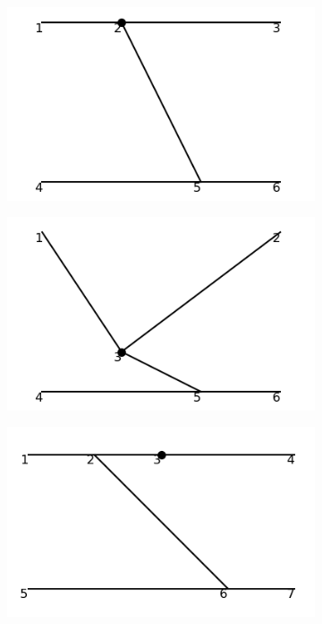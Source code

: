 \documentclass[11pt,a4paper,twoside,pdf]{article}
\numberwithin{equation}{section}
\begin{document}
\begin{figure}[h!]
\begin{subfigure}[t]{0.16\textwidth}
    \end{subfigure}
    \hfill
    \begin{subfigure}[t]{0.16\textwidth}
        \centering
        \includegraphics[width=\textwidth]{plots/order4_2to2/counterterms/4.png}
    \end{subfigure}
    \hfill
    \begin{subfigure}[t]{0.16\textwidth}
        \centering
        \includegraphics[width=\textwidth]{plots/order4_2to2/counterterms/5.png}
    \end{subfigure}
    \hfill
    \begin{subfigure}[t]{0.16\textwidth}
        \centering
        \includegraphics[width=\textwidth]{plots/order4_2to2/counterterms/6.png}

\end{subfigure}
\end{figure}
\end{document}
